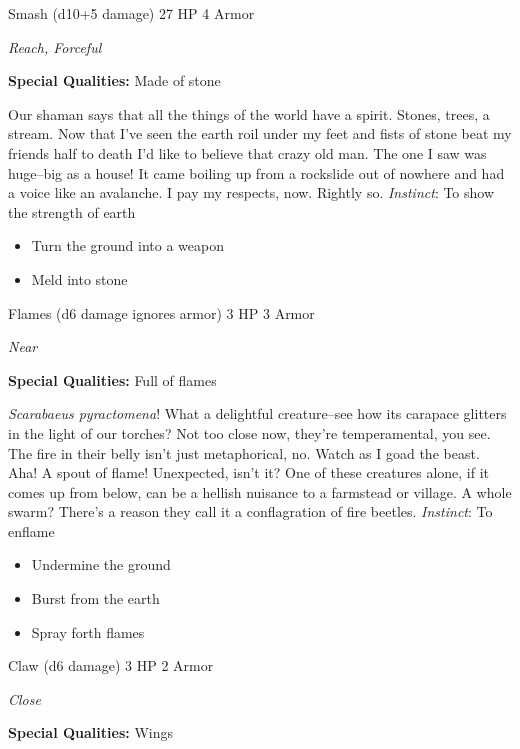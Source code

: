 \HRule
{}

Smash (d10+5 damage)\hspace*{\fill} 27 HP 4 Armor

\emph{Reach, Forceful}

\textbf{Special Qualities:}
Made of stone

\HRule
Our shaman says that all the things of the world have a spirit. Stones, trees, a stream. Now that I've seen the earth roil under my feet and fists of stone beat my friends half to death I'd like to believe that crazy old man. The one I saw was huge--big as a house! It came boiling up from a rockslide out of nowhere and had a voice like an avalanche. I pay my respects, now. Rightly so. \emph{Instinct}: To show the strength of earth
\begin{itemize}
\item Turn the ground into a weapon
\item Meld into stone
\end{itemize}
\newpage
\HRule
{}

Flames (d6 damage ignores armor)\hspace*{\fill} 3 HP 3 Armor

\emph{Near}

\textbf{Special Qualities:}
Full of flames

\HRule
\emph{Scarabaeus pyractomena}! What a delightful creature--see how its carapace glitters in the light of our torches? Not too close now, they're temperamental, you see. The fire in their belly isn't just metaphorical, no. Watch as I goad the beast. Aha! A spout of flame! Unexpected, isn't it? One of these creatures alone, if it comes up from below, can be a hellish nuisance to a farmstead or village. A whole swarm? There's a reason they call it a conflagration of fire beetles. \emph{Instinct}: To enflame
\begin{itemize}
\item Undermine the ground
\item Burst from the earth
\item Spray forth flames
\end{itemize}

\HRule
{}

Claw (d6 damage) \hspace*{\fill}3 HP 2 Armor

\emph{Close}

\textbf{Special Qualities:}
Wings

